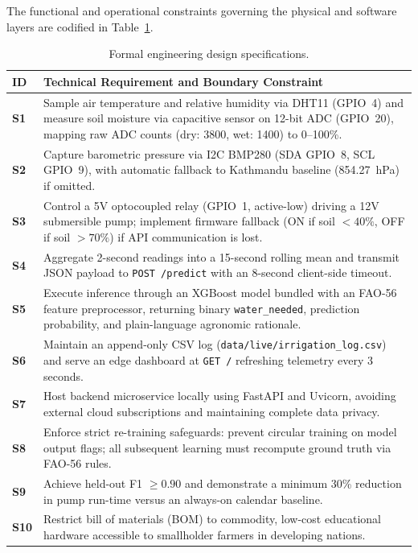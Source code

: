 \documentclass[12pt, a4paper]{article}
\begin{document}
The functional and operational constraints governing the physical and software layers are codified in Table~\ref{tab:specs}.

\begin{table}[H]
\centering
\caption{Formal engineering design specifications.}
\label{tab:specs}
\begin{tabularx}{\textwidth}{>{\bfseries}l X}
\toprule
ID & Technical Requirement and Boundary Constraint \\
\midrule
S1 & Sample air temperature and relative humidity via DHT11 (GPIO~4) and measure soil moisture via capacitive sensor on 12-bit ADC (GPIO~20), mapping raw ADC counts (dry: 3800, wet: 1400) to 0--100\%. \\
S2 & Capture barometric pressure via I2C BMP280 (SDA GPIO~8, SCL GPIO~9), with automatic fallback to Kathmandu baseline (854.27~hPa) if omitted. \\
S3 & Control a 5V optocoupled relay (GPIO~1, active-low) driving a 12V submersible pump; implement firmware fallback (ON if soil $<40\%$, OFF if soil $>70\%$) if API communication is lost. \\
S4 & Aggregate 2-second readings into a 15-second rolling mean and transmit JSON payload to \texttt{POST /predict} with an 8-second client-side timeout. \\
S5 & Execute inference through an XGBoost model bundled with an FAO-56 feature preprocessor, returning binary \texttt{water\_needed}, prediction probability, and plain-language agronomic rationale. \\
S6 & Maintain an append-only CSV log (\texttt{data/live/irrigation\_log.csv}) and serve an edge dashboard at \texttt{GET /} refreshing telemetry every 3 seconds. \\
S7 & Host backend microservice locally using FastAPI and Uvicorn, avoiding external cloud subscriptions and maintaining complete data privacy. \\
S8 & Enforce strict re-training safeguards: prevent circular training on model output flags; all subsequent learning must recompute ground truth via FAO-56 rules. \\
S9 & Achieve held-out F1 $\ge 0.90$ and demonstrate a minimum 30\% reduction in pump run-time versus an always-on calendar baseline. \\
S10 & Restrict bill of materials (BOM) to commodity, low-cost educational hardware accessible to smallholder farmers in developing nations. \\
\bottomrule
\end{tabularx}
\end{table}
\end{document}
